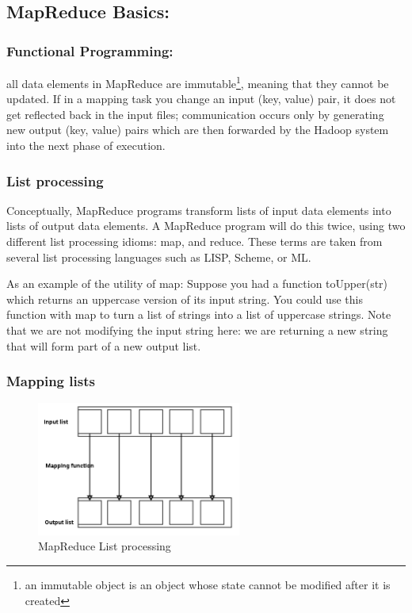 \subsection{MapReduce Basics:}

\subsubsection{Functional Programming:}
all data elements in MapReduce are immutable\footnote{an immutable object is an object whose state cannot be modified after it is created}, meaning that they cannot be updated. If in a mapping task you change an input (key, value) pair, it does not get reflected back in the input files; communication occurs only by generating new output (key, value) pairs which are then forwarded by the Hadoop system into the next phase of execution.

\subsubsection{List processing}

Conceptually, MapReduce programs transform lists of input data elements into lists of output data elements. A MapReduce program will do this twice, using two different list processing idioms: map, and reduce. These terms are taken from several list processing languages such as LISP, Scheme, or ML.

As an example of the utility of map: Suppose you had a function toUpper(str) which returns an uppercase version of its input string. You could use this function with map to turn a list of strings into a list of uppercase strings. Note that we are not modifying the input string here: we are returning a new string that will form part of a new output list.

\subsubsection{Mapping lists}

\begin{figure}
\centering
\includegraphics[width=0.6\textwidth]{../images/mapreduce1.png}
\caption{\label{fig:frog}MapReduce List processing}
\end{figure}


